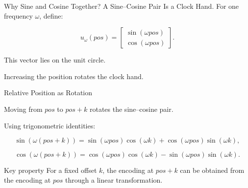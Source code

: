 \documentclass[aspectratio=169]{beamer}
\begin{document}
\begin{frame}{Why Sine and Cosine Together?}
\small
A Sine--Cosine Pair Is a Clock Hand. For one frequency \(\omega\), define:

\[
u_\omega(pos)
=
\begin{bmatrix}
\sin(\omega pos) \\
\cos(\omega pos)
\end{bmatrix}.
\]


This vector lies on the unit circle.


\begin{center}
\end{center}

Increasing the position rotates the clock hand.

\end{frame}
%
%
\begin{frame}{Relative Position as Rotation}

Moving from \(pos\) to \(pos+k\) rotates the sine--cosine pair.

\medskip

Using trigonometric identities:

\[
\sin(\omega(pos+k))
=
\sin(\omega pos)\cos(\omega k)
+
\cos(\omega pos)\sin(\omega k),
\]

\[
\cos(\omega(pos+k))
=
\cos(\omega pos)\cos(\omega k)
-
\sin(\omega pos)\sin(\omega k).
\]

\medskip

\begin{alertblock}{Key property}
For a fixed offset \(k\), the encoding at \(pos+k\) can be obtained from the encoding at \(pos\) through a linear transformation.
\end{alertblock}

\end{frame}
%
%
\end{document}
